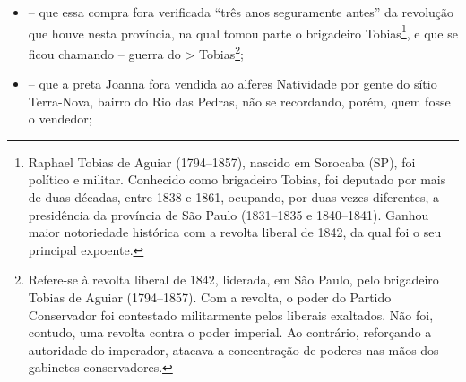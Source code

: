 {\begin{itemize}
\item
  -- que essa compra fora verificada ``três anos seguramente antes'' da
  revolução que houve nesta província, na qual tomou parte o brigadeiro
  Tobias\footnote{ Raphael Tobias de Aguiar (1794--1857), nascido em
    Sorocaba (SP), foi político e militar. Conhecido como brigadeiro
    Tobias, foi deputado por mais de duas décadas, entre 1838 e 1861,
    ocupando, por duas vezes diferentes, a presidência da província de
    São Paulo (1831--1835 e 1840--1841). Ganhou maior notoriedade
    histórica com a revolta liberal de 1842, da qual foi o seu principal
    expoente.}, e que se ficou chamando -- guerra do \textgreater{}
  Tobias\footnote{ Refere-se à revolta liberal de 1842, liderada, em
    São Paulo, pelo brigadeiro Tobias de Aguiar (1794--1857). Com a
    revolta, o poder do Partido Conservador foi contestado militarmente
    pelos liberais exaltados. Não foi, contudo, uma revolta contra o
    poder imperial. Ao contrário, reforçando a autoridade do imperador,
    atacava a concentração de poderes nas mãos dos gabinetes
    conservadores.};
\item
  -- que a preta Joanna fora vendida ao alferes Natividade por gente do
  sítio Terra-Nova, bairro do Rio das Pedras, não se recordando, porém,
  quem fosse o vendedor;
\end{itemize}

}

